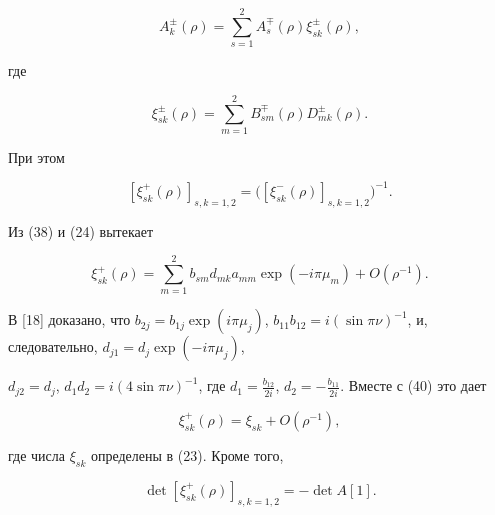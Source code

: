 \begin{pf}
\begin{equation}


A_k^{\pm}(\rho)=


 \sum_{s=1}^{2}A_s^{\mp}(\rho)\xi_{sk}^{\pm}(\rho),


\end{equation}


где


\begin{equation}


\xi_{sk}^{\pm}(\rho)=


\sum_{m=1}^{2} B_{sm}^{\mp}(\rho)D_{mk}^{\pm}(\rho).


\end{equation}


При этом


\begin{equation}


[\xi_{sk}^{+}(\rho)]_{s,k=1,2}


=\big([\xi_{sk}^{-}(\rho)]_{s,k=1,2}\big)^{-1}.


\end{equation}


Из (38) и (24) вытекает


\begin{equation}


\xi_{sk}^{+}(\rho)=\sum_{m=1}^{2}


b_{sm}d_{mk}a_{mm}\exp(-i\pi\mu_m)+O(\rho^{-1}).


\end{equation}


В [18] доказано, что $b_{2j}=b_{1j}\exp(i\pi\mu_j)$, $b_{11}b_{12}=


i(\sin\pi\nu)^{-1}$, и, следовательно, $d_{j1}=d_{j}\exp(-i\pi\mu_j)$,


$d_{j2}=d_{j}$, $d_{1}d_{2}=i(4\sin\pi\nu)^{-1}$, где $d_1=


\frac{b_{12}}{2i}$, $d_2=-\frac{b_{11}}{2i}$. Вместе с (40) это дает


\begin{equation}


\xi_{sk}^{+}(\rho)=\xi_{sk}+O(\rho^{-1}),


\end{equation}


где числа $\xi_{sk}$ определены в (23). Кроме того,


\begin{equation}


\det [\xi_{sk}^{+}(\rho)]_{s,k=1,2}=-\det A[1].


\end{equation}



\end{pf}
